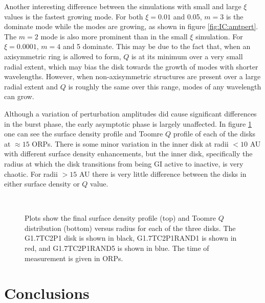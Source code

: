 Another interesting difference between the simulations with small and large $\xi$ values is the fastest growing mode. For both $\xi = 0.01$ and 0.05, $m=3$ is the dominate mode while the modes are growing, as shown in figure \ref{fig:IC:amtpert}. The $m = 2$ mode is also more prominent than in the small $\xi$ simulation. For $\xi = 0.0001$, $m = 4$ and 5 dominate. This may be due to the fact that, when an axisymmetric ring is allowed to form, $Q$ is at its minimum over a very small radial extent, which may bias the disk towards the growth of modes with shorter wavelengths. However, when non-axisymmetric structures are present over a large radial extent and $Q$ is roughly the same over this range, modes of any wavelength can grow.

Although a variation of perturbation amplitudes did cause significant differences in the burst phase, the early asymptotic phase is largely unaffected. In figure \ref{fig:IC:pertq15} one can see the surface density profile and Toomre $Q$ profile of each of the disks at $\approx 15$ ORPs. There is some minor variation in the inner disk at radii $< 10$ AU with different surface density enhancements, but the inner disk, specifically the radius at which the disk transitions from being GI active to inactive, is very chaotic. For radii $> 15$ AU there is very little difference between the disks in either surface density or $Q$ value.

\begin{figure}[p]
\centering
{}\\
\caption[Surface density and Toomre $Q$ for the simulations with varying initial random perturbations at 15 ORPs]{Plots show the final surface density profile (top) and Toomre $Q$ distribution (bottom) versus radius for each of the three disks. The G1.7TC2P1 disk is shown in black, G1.7TC2P1RAND1 is shown in red, and G1.7TC2P1RAND5 is shown in blue. The time of measurement is given in ORPs.}
\label{fig:IC:pertq15}
\end{figure}

\section{Conclusions}\label{sec:IC:conclusion}

